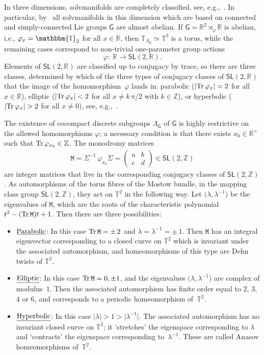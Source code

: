 \documentclass[pdftex]{sigma}
\numberwithin{equation}{section}
\newcommand{\Z}{\zed}
\newcommand{\unit}{\mathbbm{1}} 			%
\newcommand{\sfG}{\mathsf{G}}
\newcommand{\sfSL}{\mathsf{SL}}
\newcommand{\ttM}{\mathtt{M}}
\newcommand{\R}{\real}
\newcommand{\zed}{{\mathbb Z}} %
\newcommand{\real}{{\mathbb R}} %
\newcommand{\torus}{{\mathbb T}} %
\newcommand{\Tr}[1]{{\rm Tr}\,#1}
\begin{document}
In three dimensions, solvmanifolds are completely
classified, see, e.g.,~\cite{Bock2009}. In particular,
by~\cite[Proposition~5.1]{Bock2009} all solvmanifolds in
this dimension which are based on connected and simply-connected Lie groups
$\sfG$ are almost abelian. If $\sfG=\R^2\rtimes_\varphi\R$ is
abelian, i.e., $\varphi_x=\unit_2$ for all $x\in\R$, then $\torus_{\Lambda_\sfG}\simeq\torus^3$ is a torus, while
the remaining cases correspond to non-trivial one-parameter group actions
\[
\varphi\colon \ \R\longrightarrow\sfSL(2,\real) .
\]
Elements of $\sfSL(2,\R)$ are classified up to conjugacy by trace, so there are three classes, determined by which of the three types
of conjugacy classes of $\sfSL(2,\real)$ that
the image of the homomorphism~$\varphi$ lands in: parabolic
($|\Tr\varphi_x|=2$ for all $x\in\R$), elliptic ($|\Tr\varphi_x|<2$
for all $x\not=k\,\pi/2$ with $k\in \mathbb{Z}$),
or hyperbolic ($|\Tr\varphi_x|>2$ for all
$x\not=0$), see, e.g.,~\cite{Hull2005}.

The existence of cocompact discrete subgroups $\Lambda_\sfG$ of $\sfG$ is highly
restrictive on the allowed homomorphisms $\varphi$; a necessary condition is that there exists
$x_0\in\R^\times$ such that $\Tr\varphi_{x_0}\in\Z$. The monodromy matrices
\begin{gather}\label{eq:monodromy3d}
\ttM=\Sigma^{-1}\,\varphi_{x_0} \Sigma=\left(\begin{matrix} a & b \\
 c & d \end{matrix}\right) \in \sfSL(2,\Z)
\end{gather}
are integer matrices that live in the corresponding conjugacy classes
of $\sfSL(2,\Z)$. As automorphisms of the torus fibres of the Mostow bundle, in the mapping
class group $\sfSL(2,\Z)$, they act on $\torus^2$ in the following
way. Let $\big(\lambda,\lambda^{-1}\big)$ be the eigenvalues of $\ttM$, which
are the roots of the characteristic polynomial $t^2-(\Tr\ttM) t+1$. Then
there are three possibilities:
\begin{itemize}\itemsep=0pt
\item{$\underline{\rm Parabolic}$:} In this case
 $\Tr\ttM=\pm\,2$ and $\lambda=\lambda^{-1}=\pm\,1$. Then $\ttM$ has
 an integral eigenvector corresponding to a closed curve on
 $\torus^2$ which is invariant under the
 associated automorphism, and homeomorphisms of this type are Dehn twists of
 $\torus^2$.
\item{$\underline{\rm Elliptic}$:} In this case $\Tr\ttM=0,\pm 1$,
 and the eigenvalues $\big(\lambda,\lambda^{-1}\big)$ are complex of
 modulus~$1$. Then the associated automorphism has finite order
 equal to $2$, $3$, $4$ or $6$, and corresponds to a periodic
 homeomorphism of~$\torus^2$.
\item{$\underline{\rm Hyperbolic}$:} In this case
 $|\lambda|>1>\big|\lambda^{-1}\big|$. The associated automorphism has no
 invariant closed curve on $\torus^2$; it `stretches' the
 eigenspace corresponding to $\lambda$ and `contracts' the eigenspace
 corresponding to~$\lambda^{-1}$. These are called Anasov homeomorphisms of~$\torus^2$.
\end{itemize}
\end{document}
